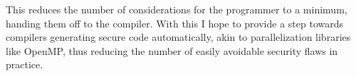 This reduces the number of considerations for the programmer to a minimum, handing them off to the compiler.
With this I hope to provide a step towards compilers generating secure code automatically, akin to parallelization libraries like OpenMP\cite{dagum1998openmp}, thus reducing the number of easily avoidable security flaws in practice.
